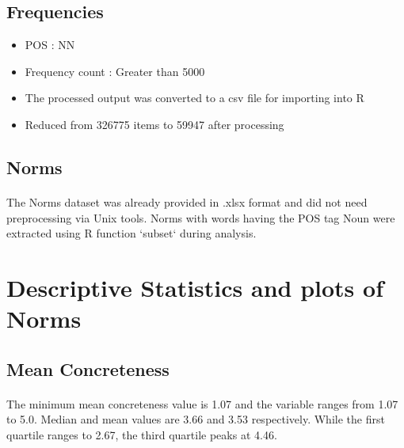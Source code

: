\documentclass[11pt,a4paper]{article}
\begin{document}
\subsection{Frequencies}
\begin{itemize}
	\item POS : NN
	\item Frequency count : Greater than 5000
	\item The processed output was converted to a csv file for importing into R
	\item Reduced from 326775 items to 59947 after processing
\end{itemize}


\subsection{Norms}
\paragraph{}
The Norms dataset was already provided in .xlsx format and did not need preprocessing via Unix tools. Norms with words having the POS tag Noun were extracted using R function `subset` during analysis.


\section{Descriptive Statistics and plots of Norms}

\subsection{Mean Concreteness}
\paragraph{}
The minimum mean concreteness value is 1.07 and the variable ranges from 1.07 to 5.0. Median and mean values are 3.66 and 3.53 respectively. While the first quartile ranges to 2.67, the third quartile peaks at 4.46.
\end{document}
